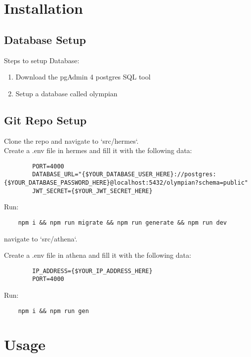 \documentclass{article}
\begin{document}
\section{Installation}

\subsection{Database Setup}

Steps to setup Database:
\begin{enumerate}
    \item Download the pgAdmin 4 postgres SQL tool
    \item Setup a database called olympian
\end{enumerate}

\subsection{Git Repo Setup}
    Clone the repo and navigate to `src/hermes`.\\
    Create a .env file in hermes and fill it with the following data:

    \begin{verbatim}
        PORT=4000
        DATABASE_URL="{$YOUR_DATABASE_USER_HERE}://postgres:{$YOUR_DATABASE_PASSWORD_HERE}@localhost:5432/olympian?schema=public"
        JWT_SECRET={$YOUR_JWT_SECRET_HERE}
    \end{verbatim}

    Run:
    \begin{verbatim}
    npm i && npm run migrate && npm run generate && npm run dev
    \end{verbatim}

    navigate to `src/athena`. 
    
    Create a .env file in athena and fill it with the following data:

    \begin{verbatim}
        IP_ADDRESS={$YOUR_IP_ADDRESS_HERE}
        PORT=4000
    \end{verbatim}

    Run:
    \begin{verbatim}
    npm i && npm run gen
    \end{verbatim}

\section{Usage}
\end{document}
